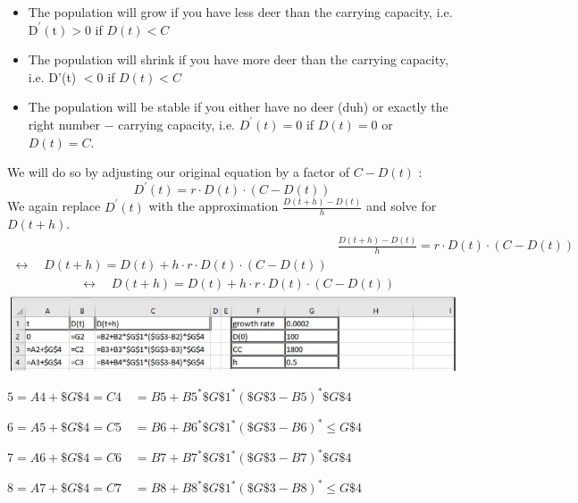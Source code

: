 \documentclass[10pt]{article}
\begin{document}
\begin{itemize}
  \item The population will grow if you have less deer than the carrying capacity, i.e. $\mathrm{D}^{\prime}(\mathrm{t})>0$ if $D(t)<C$

  \item The population will shrink if you have more deer than the carrying capacity, i.e. D'(t) $<0$ if $D(t)<C$

  \item The population will be stable if you either have no deer (duh) or exactly the right number $-$ carrying capacity, i.e. $D^{\prime}(t)=0$ if $D(t)=0$ or $D(t)=C$.

\end{itemize}
We will do so by adjusting our original equation by a factor of $C-D(t)$ :
$$
D^{\prime}(t)=r \cdot D(t) \cdot(C-D(t))
$$
We again replace $D^{\prime}(t)$ with the approximation $\frac{D(t+h)-D(t)}{h}$ and solve for $D(t+h)$.
$$
\begin{aligned}
& \frac{D(t+h)-D(t)}{h}=r \cdot D(t) \cdot(C-D(t)) \\
\leftrightarrow \quad D(t+h)=D(t)+h \cdot r \cdot D(t) \cdot(C-D(t))
\end{aligned}
$$
$$
\begin{aligned}
& \leftrightarrow \quad D(t+h)=D(t)+h \cdot r \cdot D(t) \cdot(C-D(t))
\end{aligned}
$$
\includegraphics[max width=\textwidth]{2022_07_05_5945264bba2a5f6ba667g-12}

$5=A 4+\$ G \$ 4=C 4 \quad=B 5+B 5^{*} \$ G \$ 1^{*}(\$ G \$ 3-B 5)^{*} \$ G \$ 4$

$6=A 5+\$ G \$ 4=C 5 \quad=B 6+B 6^{*} \$ G \$ 1^{*}(\$ G \$ 3-B 6)^{*} \leqslant G \$ 4$

$7=A 6+\$ G \$ 4=C 6 \quad=B 7+B 7^{*} \$ G \$ 1^{*}(\$ G \$ 3-B 7)^{*} \$ G \$ 4$

$8=A 7+\$ G \$ 4=C 7 \quad=B 8+B 8^{*} \$ G \$ 1^{*}(\$ G \$ 3-B 8)^{*} \leqslant G \$ 4$
\end{document}
